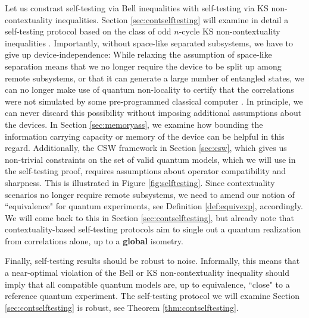 Let us constrast self-testing via Bell inequalities with self-testing via KS non-contextuality inequalities. Section \ref{sec:contselftesting} will examine in detail a self-testing protocol based on the class of odd $n$-cycle KS non-contextuality inequalities \cite{Bharti2019}. Importantly, without space-like separated subsystems, we have to give up device-independence: While relaxing the assumption of space-like separation means that we no longer require the device to be split up among remote subsystems, or that it can generate a large number of entangled states, we can no longer make use of quantum non-locality to certify that the correlations were not simulated by some pre-programmed classical computer \cite{Supic2020}. In principle, we can never discard this possibility without imposing additional assumptions about the devices. In Section \ref{sec:memoryass}, we examine how bounding the information carrying capacity or memory of the device can be helpful in this regard. Additionally, the CSW framework in Section \ref{sec:csw}, which gives us non-trivial constraints on the set of valid quantum models, which we will use in the self-testing proof, requires assumptions about operator compatibility and sharpness. This is illustrated in Figure \ref{fig:selftesting}. Since contextuality scenarios no longer require remote subsystems, we need to amend our notion of ``equivalence" for quantum experiments, see Definition \ref{def:equivexp}, accordingly. We will come back to this in Section \ref{sec:contselftesting}, but already note that contextuality-based self-testing protocols aim to single out a quantum realization from correlations alone, up to a \textbf{global} isometry.

Finally, self-testing results should be robust to noise. Informally, this means that a near-optimal violation of the Bell or KS non-contextuality inequality should imply that all compatible quantum models are, up to equivalence, ``close" to a reference quantum experiment. The self-testing protocol we will examine Section \ref{sec:contselftesting} is robust, see Theorem \ref{thm:contselftesting}.

